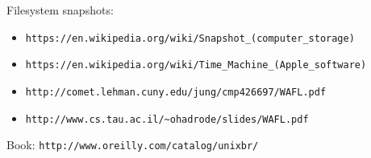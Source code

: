 \documentclass[xga]{xdvislides}
\begin{document}
Filesystem snapshots:
\begin{itemize}
	\item \verb+https://en.wikipedia.org/wiki/Snapshot_(computer_storage)+
	\item \verb+https://en.wikipedia.org/wiki/Time_Machine_(Apple_software)+
	\item \verb+http://comet.lehman.cuny.edu/jung/cmp426697/WAFL.pdf+
	\item \verb+http://www.cs.tau.ac.il/~ohadrode/slides/WAFL.pdf+
\end{itemize}
\vspace{.5in}
Book: \verb+http://www.oreilly.com/catalog/unixbr/+
\end{document}
